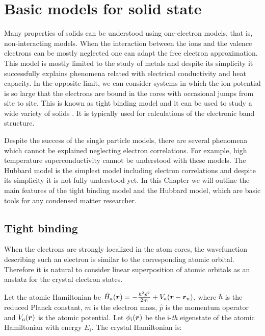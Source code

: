 \chapter{Basic models for solid state}
\label{ChapBasicModels}

Many properties of solids can be understood using one-electron models, that is, non-interacting models. When the interaction between the ions and the valence electrons can be mostly neglected one can adapt the free electron approximation. This model is mostly limited to the study of metals and despite its simplicity it successfully explains phenomena related with electrical conductivity and heat capacity. In the opposite limit, we can consider systems in which the ion potential is so large that the electrons are bound in the cores with occasional jumps from site to site. This is known as tight binding model and it can be used to study a wide variety of solids \cite{Ashcroft}. It is typically used for calculations of the electronic band structure.

Despite the success of the single particle models, there are several phenomena which cannot be explained neglecting electron correlations. For example, high temperature superconductivity cannot be understood with these models. The Hubbard model is the simplest model including electron correlations and despite its simplicity it is not fully understood yet. In this Chapter we will outline the main features of the tight binding model and the Hubbard model, which are basic tools for any condensed matter researcher.

\section{Tight binding}

When the electrons are strongly localized in the atom cores, the wavefunction describing such an electron is similar to the corresponding atomic orbital. Therefore it is natural to consider linear superposition of atomic orbitals as an anstatz for the crystal electron states.

Let the atomic Hamiltonian be $\hat{H}_a(\boldsymbol{r}) = -\frac{\hbar^2\hat{p}^2}{2m} + V_a(\boldsymbol{r}-\boldsymbol{r}_n)$, where $\hbar$ is the reduced Planck constant, $m$ is the electron mass, $\hat{p}$ is the momentum operator and $V_a(\boldsymbol{r})$ is the atomic potential. Let $\phi_i(\boldsymbol{r})$ be the i-\textit{th} eigenstate of the atomic Hamiltonian with energy $E_i$. The crystal Hamiltonian is:

